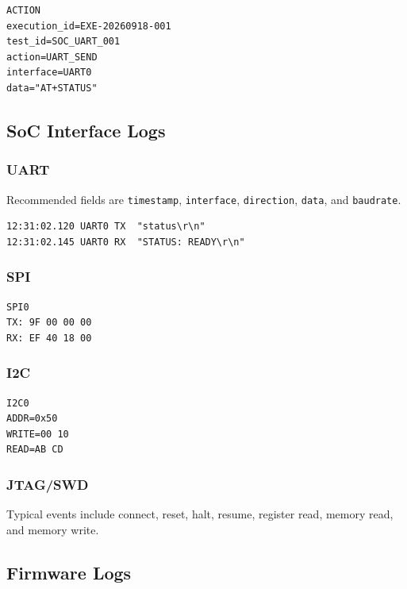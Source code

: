 \documentclass[
  11pt,
  letterpaper,
  DIV=11,
  numbers=noendperiod]{scrartcl}
\begin{document}
\begin{verbatim}
ACTION
execution_id=EXE-20260918-001
test_id=SOC_UART_001
action=UART_SEND
interface=UART0
data="AT+STATUS"
\end{verbatim}

\subsection{SoC Interface Logs}\label{soc-interface-logs}

\subsubsection{UART}\label{uart}

Recommended fields are \texttt{timestamp}, \texttt{interface},
\texttt{direction}, \texttt{data}, and \texttt{baudrate}.

\begin{verbatim}
12:31:02.120 UART0 TX  "status\r\n"
12:31:02.145 UART0 RX  "STATUS: READY\r\n"
\end{verbatim}

\subsubsection{SPI}\label{spi}

\begin{verbatim}
SPI0
TX: 9F 00 00 00
RX: EF 40 18 00
\end{verbatim}

\subsubsection{I2C}\label{i2c}

\begin{verbatim}
I2C0
ADDR=0x50
WRITE=00 10
READ=AB CD
\end{verbatim}

\subsubsection{JTAG/SWD}\label{jtagswd}

Typical events include connect, reset, halt, resume, register read,
memory read, and memory write.

\subsection{Firmware Logs}\label{firmware-logs}
\end{document}
